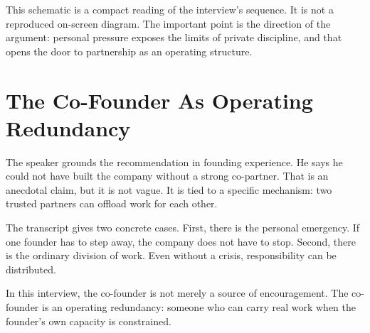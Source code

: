 \begin{figure}
\centering
{}
\end{figure}

This schematic is a compact reading of the interview's sequence. It is not a reproduced on-screen diagram. The important point is the direction of the argument: personal pressure exposes the limits of private discipline, and that opens the door to partnership as an operating structure.

\section{The Co-Founder As Operating Redundancy}

The speaker grounds the recommendation in founding experience. He says he could not have built the company without a strong co-partner. That is an anecdotal claim, but it is not vague. It is tied to a specific mechanism: two trusted partners can offload work for each other.

The transcript gives two concrete cases. First, there is the personal emergency. If one founder has to step away, the company does not have to stop. Second, there is the ordinary division of work. Even without a crisis, responsibility can be distributed.

\begin{proposition}
In this interview, the co-founder is not merely a source of encouragement. The co-founder is an operating redundancy: someone who can carry real work when the founder's own capacity is constrained.
\end{proposition}

